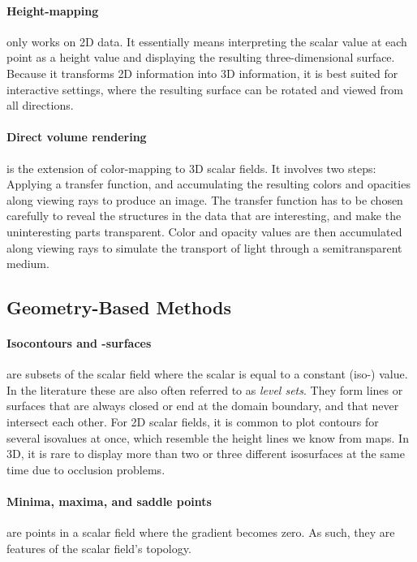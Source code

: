 %
\paragraph{Height-mapping} only works on \ac{2D} data.
%
It essentially means interpreting the scalar value at each point as a height
value and displaying the resulting three-dimensional surface.
%
Because it transforms \ac{2D} information into \ac{3D} information, it is best
suited for interactive settings, where the resulting surface can be rotated and
viewed from all directions.
%

%
\paragraph{Direct volume rendering} is the extension of color-mapping to \ac{3D}
scalar fields.
%
It involves two steps: Applying a transfer function, and accumulating the
resulting colors and opacities along viewing rays to produce an image.
%
The transfer function has to be chosen carefully to reveal the structures in the
data that are interesting, and make the uninteresting parts transparent.
%
Color and opacity values are then accumulated along viewing rays to simulate the
transport of light through a semitransparent medium.
%

\subsection{Geometry-Based Methods} %
\label{sub:geometry_based_methods}
%
\paragraph{Isocontours and -surfaces} are subsets of the scalar field where the
scalar is equal to a constant (iso-) value.
%
In the literature these are also often referred to as \emph{level sets}.
%
They form lines or surfaces that are always closed or end at the domain
boundary, and that never intersect each other.
%
For \ac{2D} scalar fields, it is common to plot contours for several isovalues
at once, which resemble the height lines we know from maps.
%
In \ac{3D}, it is rare to display more than two or three different isosurfaces
at the same time due to occlusion problems.
%

%
\paragraph{Minima, maxima, and saddle points} are points in a scalar field where
the gradient becomes zero.
%
As such, they are features of the scalar field's topology.
%

